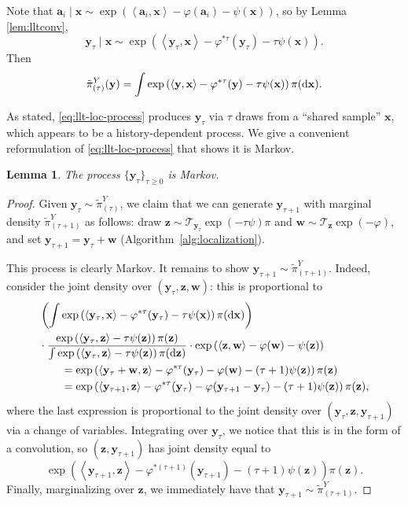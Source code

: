 \documentclass[11pt]{article}
\newtheorem{lemma}{Lemma}
\newcommand{\inprod}[2]{\left\langle#1, #2\right\rangle}
\newcommand{\dd}{\textup{d}}
\newcommand{\Par}[1]{\left(#1\right)}
\newcommand{\0}{\mathbf{0}}
\newcommand{\1}{\mathbf{1}}
\newcommand{\va}{\mathbf{a}}
\newcommand{\vw}{\mathbf{w}}
\newcommand{\vx}{\mathbf{x}}
\newcommand{\vy}{\mathbf{y}}
\newcommand{\vz}{\mathbf{z}}
\newcommand{\tpi}{\tilde{\pi}}
\begin{document}
Note that $\va_i\mid \vx\sim \exp\Par{\inprod{\va_i}{\vx}-\varphi(\va_i)-\psi(\vx)}$, so by Lemma \ref{lem:lltconv}, 
\[\vy_\tau\mid \vx \sim \exp\Par{\inprod{\vy_\tau}{\vx}-\varphi^{*\tau}(\vy_\tau)-\tau\psi(\vx)}.\]
Then
\[\tpi_{(\tau)}^Y(\vy)= \int \exp\Par{\inprod{\vy}{\vx}-\varphi^{*\tau}(\vy)-\tau\psi(\vx)}\pi(\dd \vx).\]

As stated, \eqref{eq:llt-loc-process} produces $\vy_\tau$ via $\tau$ draws from a ``shared sample'' $\vx$, which appears to be a history-dependent process. We give a convenient reformulation of \eqref{eq:llt-loc-process} that shows it is Markov.

\begin{lemma}\label{lem:ck-markov}
    The process $\{\vy_\tau\}_{\tau\geq 0}$ is Markov.
\end{lemma}
\begin{proof}
    Given $\vy_{\tau}\sim \tpi_{(\tau)}^Y$, we claim that we can generate $\vy_{\tau+1}$ with marginal density $\tpi_{(\tau+1)}^Y$ as follows: draw $\vz\sim \mathcal{T}_{\vy_\tau}\exp(-\tau\psi)\pi$ and $\vw\sim \mathcal{T}_{\vz}\exp(-\varphi)$, and set $\vy_{\tau+1}=\vy_\tau+\vw$ (Algorithm~\ref{alg:localization}). 
    
    This process is clearly Markov.  It remains to show $\vy_{\tau+1}\sim \tpi_{(\tau+1)}^Y$.  Indeed, consider the joint density over $(\vy_{\tau}, \vz, \vw)$: this is proportional to
    \begin{align*}
        &\Par{\int \exp\Par{\inprod{\vy_\tau}{\vx} -\varphi^{*\tau}(\vy_\tau)-\tau\psi(\vx) }\pi(\dd \vx)}\\
        & \cdot \frac{\exp\Par{ \inprod{\vy_{\tau}}{\vz}-\tau\psi(\vz)  }\pi(\vz)}{\int \exp\Par{ \inprod{\vy_{\tau}}{\vz}-\tau\psi(\vz) }\pi(\dd\vz)}\cdot \exp\Par{\inprod{\vz}{\vw}-\varphi(\vw)-\psi(\vz)}\\
        &\qquad=\exp\Par{\inprod{\vy_\tau+\vw}{\vz}-\varphi^{*\tau}(\vy_{\tau})-\varphi(\vw)-(\tau+1)\psi(\vz)}\pi(\vz)\\
        &\qquad=\exp\Par{\inprod{\vy_{\tau+1}}{\vz}-\varphi^{*\tau}(\vy_{\tau})-\varphi(\vy_{\tau+1}-\vy_{\tau})-(\tau+1)\psi(\vz)}\pi(\vz), 
    \end{align*}
    where the last expression is proportional to the joint density over $(\vy_{\tau}, \vz, \vy_{\tau+1})$ via a change of variables.  Integrating over $\vy_\tau$, we notice that this is in the form of a convolution, so $(\vz, \vy_{\tau+1})$ has joint density equal to
    \[\exp\Par{\inprod{\vy_{\tau+1}}{\vz}-\varphi^{*(\tau+1)}(\vy_{\tau+1})-(\tau+1)\psi(\vz)}\pi(\vz).\]
    Finally, marginalizing over $\vz$, we immediately have that $\vy_{\tau+1}\sim \tpi_{(\tau+1)}^Y$.
\end{proof}
\end{document}
